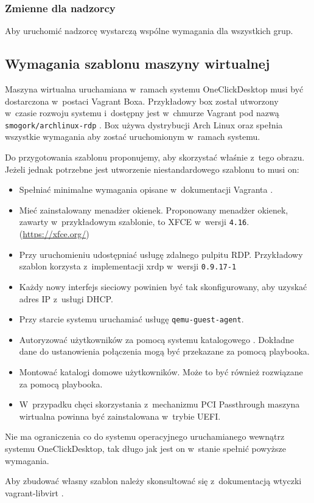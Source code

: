 \documentclass[../opis-rozwiazania.tex]{subfiles}
\begin{document}
\subsubsection{Zmienne dla nadzorcy}
Aby uruchomić nadzorcę wystarczą wspólne wymagania dla wszystkich grup.

\subsection{Wymagania szablonu maszyny wirtualnej}
\label{system_requirements.vagrant_box}
Maszyna wirtualna uruchamiana w~ramach systemu OneClickDesktop musi być dostarczona w~postaci Vagrant Boxa.
Przykładowy box został utworzony w~czasie rozwoju systemu i~dostępny jest w~chmurze Vagrant pod nazwą \texttt{smogork/archlinux-rdp} \parencite{ocd-vbox}.
Box używa dystrybucji Arch Linux oraz spełnia wszystkie wymagania aby zostać uruchomionym w~ramach systemu.

Do przygotowania szablonu proponujemy, aby skorzystać właśnie z~tego obrazu.
Jeżeli jednak potrzebne jest utworzenie niestandardowego szablonu to musi on:
\begin{itemize}
  \item Spełniać minimalne wymagania opisane w~dokumentacji Vagranta \parencite{vagrant-basebox}.
  \item Mieć zainstalowany menadżer okienek. Proponowany menadżer okienek, zawarty w~przykładowym szablonie, to XFCE w~wersji \texttt{4.16}. (\url{https://xfce.org/})
  \item Przy uruchomieniu udostępniać usługę zdalnego pulpitu RDP. Przykładowy szablon korzysta z~implementacji xrdp w~wersji \texttt{0.9.17-1}
  \item Każdy nowy interfejs sieciowy powinien być tak skonfigurowany, aby uzyskać adres IP z~usługi DHCP.
  \item Przy starcie systemu uruchamiać usługę \texttt{qemu-guest-agent}.
  \item Autoryzować użytkowników za pomocą systemu katalogowego \parencite{ldap-wiki}. Dokładne dane do ustanowienia połączenia mogą być przekazane za pomocą playbooka.
  \item Montować katalogi domowe użytkowników. Może to być również rozwiązane za pomocą playbooka.
  \item W~przypadku chęci skorzystania z~mechanizmu PCI Passthrough maszyna wirtualna powinna być zainstalowana w~trybie UEFI.
\end{itemize}
Nie ma ograniczenia co do systemu operacyjnego uruchamianego wewnątrz systemu OneClickDesktop, tak długo jak jest on w~stanie spełnić powyższe wymagania.

Aby zbudować własny szablon należy skonsultować się z~dokumentacją wtyczki vagrant-libvirt \parencite{vlibvirt-box}.
\end{document}

